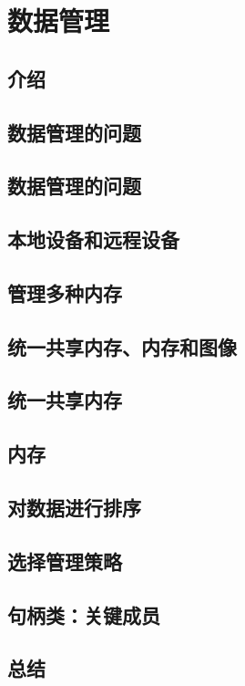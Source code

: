 \documentclass[11pt,a4paper,UTF8]{ctexart}
\begin{document}
	\section{数据管理}
		\subsection{介绍}
		\subsection{数据管理的问题}
		\subsection{数据管理的问题}
		\subsection{本地设备和远程设备}
		\subsection{管理多种内存}
		\subsection{统一共享内存、内存和图像}
		\subsection{统一共享内存}
		\subsection{内存}
		\subsection{对数据进行排序}
		\subsection{选择管理策略}
		\subsection{句柄类：关键成员}
		\subsection{总结}
\end{document}
